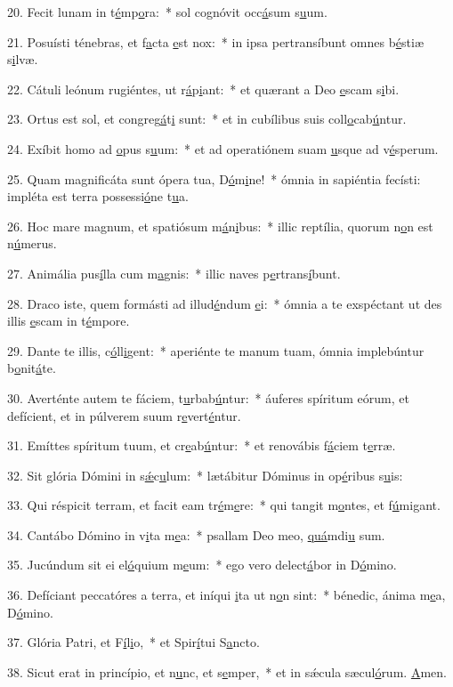 20. Fecit lunam in t\uline{é}mp\uline{o}ra:~* sol cognóvit occ\uline{á}sum s\uline{u}um.\par 
21. Posuísti ténebras, et f\uline{a}cta \uline{e}st nox:~* in ipsa pertransíbunt omnes b\uline{é}stiæ s\uline{i}lvæ.\par 
22. Cátuli leónum rugiéntes, ut r\uline{á}p\uline{i}ant:~* et quærant a Deo \uline{e}scam s\uline{i}bi.\par 
23. Ortus est sol, et congreg\uline{á}t\uline{i} sunt:~* et in cubílibus suis coll\uline{o}cab\uline{ú}ntur.\par 
24. Exíbit homo ad \uline{o}pus s\uline{u}um:~* et ad operatiónem suam \uline{u}sque ad v\uline{é}sperum.\par 
25. Quam magnificáta sunt ópera tua, D\uline{ó}m\uline{i}ne!~* ómnia in sapiéntia fecísti: impléta est terra possessi\uline{ó}ne t\uline{u}a.\par 
26. Hoc mare magnum, et spatiósum m\uline{á}n\uline{i}bus:~* illic reptília, quorum n\uline{o}n est n\uline{ú}merus.\par 
27. Animália pus\uline{í}lla cum m\uline{a}gnis:~* illic naves p\uline{e}rtrans\uline{í}bunt.\par 
28. Draco iste, quem formásti ad illud\uline{é}ndum \uline{e}i:~* ómnia a te exspéctant ut des illis \uline{e}scam in t\uline{é}mpore.\par 
29. Dante te illis, c\uline{ó}ll\uline{i}gent:~* aperiénte te manum tuam, ómnia implebúntur b\uline{o}nit\uline{á}te.\par 
30. Averténte autem te fáciem, t\uline{u}rbab\uline{ú}ntur:~* áuferes spíritum eórum, et defícient, et in púlverem suum r\uline{e}vert\uline{é}ntur.\par 
31. Emíttes spíritum tuum, et cr\uline{e}ab\uline{ú}ntur:~* et renovábis f\uline{á}ciem t\uline{e}rræ.\par 
32. Sit glória Dómini in s\uline{ǽ}c\uline{u}lum:~* lætábitur Dóminus in op\uline{é}ribus s\uline{u}is:\par 
33. Qui réspicit terram, et facit eam tr\uline{é}m\uline{e}re:~* qui tangit m\uline{o}ntes, et f\uline{ú}migant.\par 
34. Cantábo Dómino in v\uline{i}ta m\uline{e}a:~* psallam Deo meo, \uline{quá}mdi\uline{u} sum.\par 
35. Jucúndum sit ei el\uline{ó}quium m\uline{e}um:~* ego vero delect\uline{á}bor in D\uline{ó}mino.\par 
36. Defíciant peccatóres a terra, et iníqui \uline{i}ta ut n\uline{o}n sint:~* bénedic, ánima m\uline{e}a, D\uline{ó}mino.\par 
37. Glória Patri, et F\uline{í}l\uline{i}o,~* et Spir\uline{í}tui S\uline{a}ncto.\par 
38. Sicut erat in princípio, et n\uline{u}nc, et s\uline{e}mper,~* et in sǽcula sæcul\uline{ó}rum. \uline{A}men.\par 
